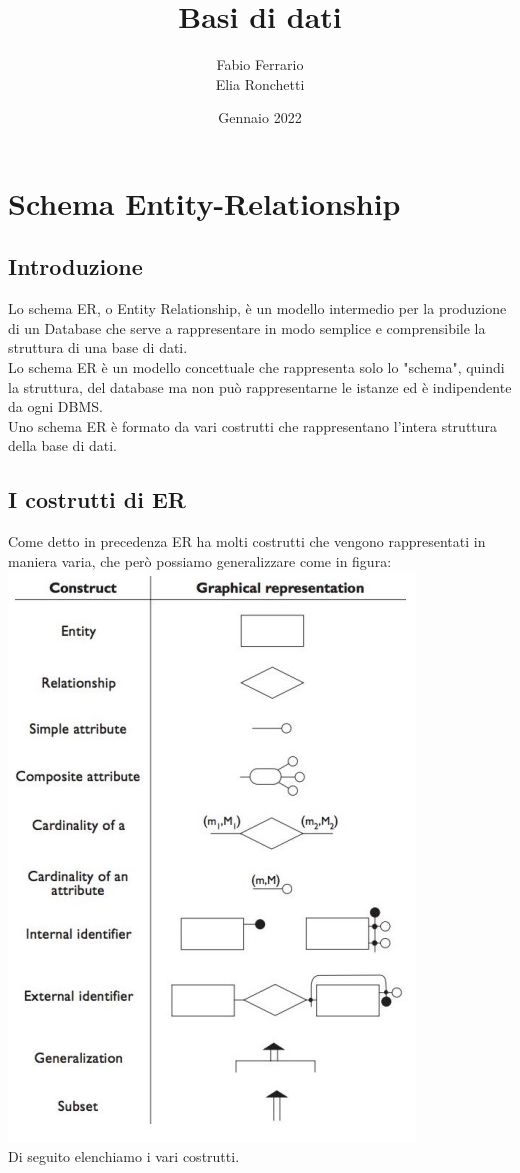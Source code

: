 \documentclass[12pt, a4paper, openany]{book}
\begin{document}
\title{Basi di dati}
\author{Fabio Ferrario\\Elia Ronchetti}
\date{Gennaio 2022}

\maketitle
\tableofcontents


\chapter{Schema Entity-Relationship}

\section{Introduzione}
Lo schema ER, o Entity Relationship, è un modello intermedio per la produzione di un Database che serve a rappresentare in modo semplice e comprensibile la struttura di una base di dati.
\\Lo schema ER è un modello concettuale che rappresenta solo lo "schema", quindi la struttura, del database ma non può rappresentarne le istanze ed è indipendente da ogni DBMS.
\\Uno schema ER è formato da vari costrutti che rappresentano l'intera struttura della base di dati.

\section{I costrutti di ER}
Come detto in precedenza ER ha molti costrutti che vengono rappresentati in maniera varia, che però possiamo generalizzare come in figura:
\\\includegraphics{rappresentazione-er.jpg}
\\Di seguito elenchiamo i vari costrutti.
\end{document}
